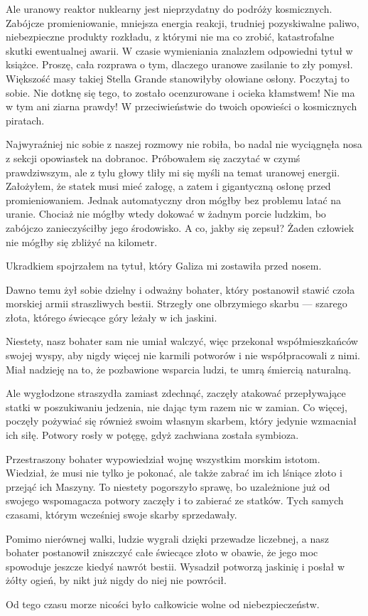 \begin{dialogue}
	\ds{} Ale uranowy reaktor nuklearny jest nieprzydatny do podróży kosmicznych. Zabójcze promieniowanie, mniejsza energia reakcji, trudniej pozyskiwalne paliwo, niebezpieczne produkty rozkładu, z którymi nie ma co zrobić, katastrofalne skutki ewentualnej awarii. \dm{} W czasie wymieniania znalazłem odpowiedni tytuł w książce. \dm{} Proszę, cała rozprawa o tym, dlaczego uranowe zasilanie to zły pomysł. Większość masy takiej Stella Grande stanowiłyby ołowiane osłony. Poczytaj to sobie.
	\ds{} Nie dotknę się tego, to zostało ocenzurowane i ocieka kłamstwem! Nie ma w tym ani ziarna prawdy!
	\ds{} W przeciwieństwie do twoich opowieści o kosmicznych piratach.
\end{dialogue}

Najwyraźniej nic sobie z naszej rozmowy nie robiła, bo nadal nie wyciągnęła nosa z sekcji opowiastek na dobranoc.
Próbowałem się zaczytać w czymś prawdziwszym, ale z tylu głowy tliły mi się myśli na temat uranowej energii.
Założyłem, że statek musi mieć załogę, a zatem i gigantyczną osłonę przed promieniowaniem.
Jednak automatyczny dron mógłby bez problemu latać na uranie.
Chociaż nie mógłby wtedy dokować w żadnym porcie ludzkim, bo zabójczo zanieczyściłby jego środowisko.
A co, jakby się zepsuł? Żaden człowiek nie mógłby się zbliżyć na kilometr.

Ukradkiem spojrzałem na tytuł, który Galiza mi zostawiła przed nosem.

\begin{poem}
	Dawno temu żył sobie dzielny i odważny bohater, który postanowił stawić czoła morskiej armii straszliwych bestii. 
	Strzegły one olbrzymiego skarbu --- szarego złota, którego świecące góry leżały w ich jaskini.
	
	Niestety, nasz bohater sam nie umiał walczyć, więc przekonał współmieszkańców swojej wyspy, aby nigdy więcej nie karmili potworów i nie współpracowali z nimi. 
	Miał nadzieję na to, że pozbawione wsparcia ludzi, te umrą śmiercią naturalną.
	
	Ale wygłodzone straszydła zamiast zdechnąć, zaczęły atakować przepływające statki w poszukiwaniu jedzenia, nie dając tym razem nic w zamian. 
	Co więcej, poczęły pożywiać się również swoim własnym skarbem, który jedynie wzmacniał ich siłę. 
	Potwory rosły w potęgę, gdyż zachwiana została symbioza.
	
	Przestraszony bohater wypowiedział wojnę wszystkim morskim istotom. 
	Wiedział, że musi nie tylko je pokonać, ale także zabrać im ich lśniące złoto i przejąć ich Maszyny.
	To niestety pogorszyło sprawę, bo uzależnione już od swojego wspomagacza potwory zaczęły i to zabierać ze statków. 
	Tych samych czasami, którym wcześniej swoje skarby sprzedawały.
	
	Pomimo nierównej walki, ludzie wygrali dzięki przewadze liczebnej, a nasz bohater postanowił zniszczyć całe świecące złoto w obawie, że jego moc spowoduje jeszcze kiedyś nawrót bestii. 
	Wysadził potworzą jaskinię i posłał w żółty ogień, by nikt już nigdy do niej nie powrócił.
	
	Od tego czasu morze nicości było całkowicie wolne od niebezpieczeństw.
\end{poem}

